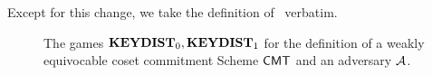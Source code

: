 \documentclass[version=final]{iacrcc}
\theoremstyle{mytheorem}				\newtheorem{theorem}{Theorem}
\theoremstyle{myplain}
\theoremstyle{mydefinition}
\theoremstyle{myremark}
\begin{document}
Except for this change, we take the definition of~\cite{EC:PanWag23} verbatim.
\begin{figure}[ht]
		\centering
		\nicoresetlinenr
		\noindent{}
		\caption{The games $\mathbf{KEYDIST}_{0}, \mathbf{KEYDIST}_{1}$ for the definition of a weakly equivocable coset commitment Scheme $\mathsf{CMT}$ and an adversary $\mathcal{A}$.}
		\label{fig:game:commitment:keyindist}
\end{figure}
\end{document}
